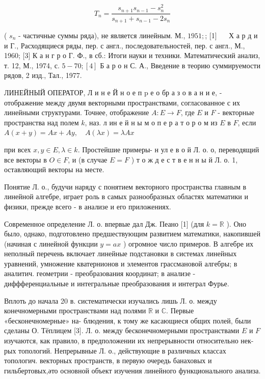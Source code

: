 \documentclass[10pt]{article}
\begin{document}
\[

T_{n}=\frac{s_{n+1} s_{n-1}-s_{n}^{2}}{s_{n+1}+s_{n-1}-2 s_{n}}

\]



( $s_{n}$ - частичные суммы ряда), не является линейным. М., $1951 ;$; [1] $\quad$ Х а р д и и Г., Расходящиеся ряды, пер. с англ., последовательностей, пер. с англ., М., 1960; [3] К а н г р о Г. Ф., в сб.: Итоги науки и техники. Математический анализ, т. 12, М., 1974, с. $5-70 ;[4]$ Б а р о н С. А., Введение в теорию суммируемости рядов, 2 изд., Тал., 1977.



ЛИНЕЙНЫЙ ОПЕРАТОР, Л и н е Й н о е п $\mathrm{p}$ е о бр а з о в а н и е, - отображение между двумя векторными пространствами, согласованное с их линейными структурами. Точнее, отображение $A: E \rightarrow F$, где $E$ и $F$ - векторные пространства над полем $k$, наз. л ин е й н ы м о п е р а т о р о м из $E$ в $F$, если $A(x+y)=A x+A y, \quad A(\lambda x)=\lambda A x$



при всех $x, y \in E, \lambda \in k$. Простейшие примеры- н ул е в о й Л. о. о, переводящий все векторы в $O \in F$, и (в случае $E=F$ ) т о ж д е с т в е н н ы й Л. о. 1, оставляющий векторы на месте.



Понятие Л. о., будучи наряду с понятием векторного пространства главным в линейной алгебре, играет роль в самых разнообразных областях математики и физики, прежде всего - в анализе и его приложениях.



Современное определение Л. о. впервые дал Дж. Пеано [1] (для $k=\mathbb{R}$ ). Оно было, однако, подготовлено предшествующим развитием математики, накопившей (начиная с линейной функции $y=a x$ ) огромное число примеров. В алгебре их неполный перечень включает линейные подстановки в системах линейных уравнений, умножение кватернионов и элементов грассмановой алгебры; в аналитич. геометрии - преобразования координат; в анализе - диффференциальные и интегральные преобразования и интеграл Фурье.



Вплоть до начала 20 в. систематически изучались лишь Л. о. между конечномерными пространствами над полями $\mathbb{R}$ и $\mathbb{C}$. Первые «бесконечномерные» на- блюдения, к тому же касающиеся общих полей, были сделаны О. Тёплицем [3]. Л. о. между бесконечномерными пространствами $E$ и $F$ изучаются, как правило, в предположении их непрерывности относительно нек-рых топологий. Непрерывные Л. о., действующие в различных классах топологич. векторных пространств, в первую очередь банаховых и гильбертовых,әто основной объект изучения линейного функционального анализа.
\end{document}
